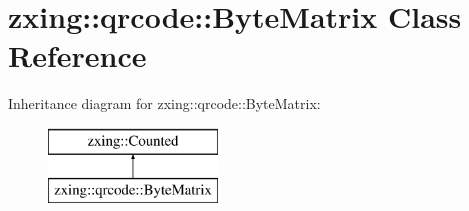 \hypertarget{classzxing_1_1qrcode_1_1_byte_matrix}{}\section{zxing\+:\+:qrcode\+:\+:Byte\+Matrix Class Reference}
\label{classzxing_1_1qrcode_1_1_byte_matrix}
Inheritance diagram for zxing\+:\+:qrcode\+:\+:Byte\+Matrix\+:\begin{figure}[H]
\begin{center}
\leavevmode
\includegraphics[height=2.000000cm]{classzxing_1_1qrcode_1_1_byte_matrix}
\end{center}
\end{figure}
